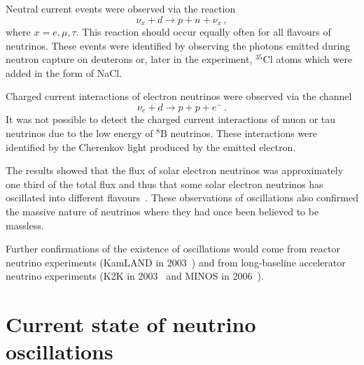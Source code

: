 Neutral current events were observed via the reaction
\begin{equation}
  \nu_{x} + d \rightarrow p + n + \nu_{x} \, ,
\end{equation}
where $x = e, \mu, \tau$.
This reaction should occur equally often for all flavours of neutrinos.
These events were identified by observing the photons emitted during neutron capture on deuterons or, later in the experiment, $^{35}\text{Cl}$ atoms which were added in the form of NaCl.  

Charged current interactions of electron neutrinos were observed via the channel
\begin{equation}
  \nu_{e} + d \rightarrow p + p + e^{-} \, .
\end{equation}
It was not possible to detect the charged current interactions of muon or tau neutrinos due to the low energy of $^{8}\text{B}$ neutrinos.
These interactions were identified by the Cherenkov light produced by the emitted electron.

The results showed that the flux of solar electron neutrinos was approximately one third of the total flux and thus that some solar electron neutrinos has oscillated into different flavours~\cite{SNO}.
These observations of oscillations also confirmed the massive nature of neutrinos where they had once been believed to be massless.

Further confirmations of the existence of oscillations would come from reactor neutrino experiments (KamLAND in 2003~\cite{kamland2003}) and from long-baseline accelerator neutrino experiments (K2K in 2003~\cite{k2kDisapp} and MINOS in 2006~\cite{minosDisapp}).

\section{Current state of neutrino oscillations}
\label{sec:history:currentState}

